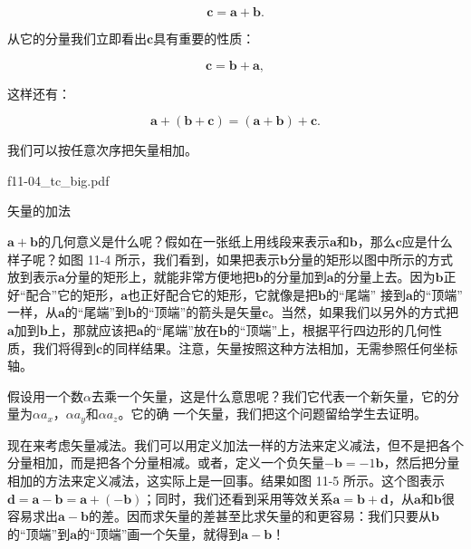 \documentclass[12pt,oneside]{book}
\providecommand{\FLPvec}[1]{\boldsymbol{#1}}
\providecommand{\FLPa}[0]{\FLPvec{a}}
\providecommand{\FLPb}[0]{\FLPvec{b}}
\providecommand{\FLPc}[0]{\FLPvec{c}}
\begin{document}
\begin{equation*}
\FLPc = \FLPa + \FLPb.
\end{equation*}

从它的分量我们立即看出$\boldsymbol{c}$具有重要的性质：

\begin{equation*}
\FLPc = \FLPb + \FLPa,
\end{equation*}

这样还有：

\begin{equation*}
\FLPa + (\FLPb + \FLPc) = (\FLPa + \FLPb) + \FLPc.
\end{equation*}


我们可以按任意次序把矢量相加。

\begin{fig}{f11-04_tc_big.pdf}
\caption{矢量的加法}
\label{fig:图11-4}
\end{fig}

$\boldsymbol{a} + \boldsymbol{b}$的几何意义是什么呢？假如在一张纸上用线段来表示$\boldsymbol{a}$和$\boldsymbol{b}$，那么$\boldsymbol{c}$应是什么样子呢？如图 11-4 所示，我们看到，如果把表示$\boldsymbol{b}$分量的矩形以图中所示的方式放到表示$\boldsymbol{a}$分量的矩形上，就能非常方便地把$\boldsymbol{b}$的分量加到$\boldsymbol{a}$的分量上去。因为$\boldsymbol{b}$正好“配合”它的矩形，$\boldsymbol{a}$也正好配合它的矩形，它就像是把$\boldsymbol{b}$的“尾端” 接到$\boldsymbol{a}$的“顶端” 一样，从$\boldsymbol{a}$的“尾端”到$\boldsymbol{b}$的“顶端”的箭头是矢量$\boldsymbol{c}$。当然，如果我们以另外的方式把$\boldsymbol{a}$加到$\boldsymbol{b}$上，那就应该把$\boldsymbol{a}$的“尾端”放在$\boldsymbol{b}$的“顶端”上，根据平行四边形的几何性质，我们将得到$\boldsymbol{c}$的同样结果。注意，矢量按照这种方法相加，无需参照任何坐标轴。


假设用一个数$\alpha$去乘一个矢量，这是什么意思呢？我们它代表一个新矢量，它的分量为$\alpha a_x$，$\alpha a_y$和$\alpha a_z$。它的确 一个矢量，我们把这个问题留给学生去证明。


现在来考虑矢量减法。我们可以用定义加法一样的方法来定义减法，但不是把各个分量相加，而是把各个分量相减。或者，定义一个负矢量$-\boldsymbol{b} = -1\boldsymbol{b}$，然后把分量相加的方法来定义减法，这实际上是一回事。结果如图 11-5 所示。这个图表示$\boldsymbol{d} = \boldsymbol{a} - \boldsymbol{b} = \boldsymbol{a} + (-\boldsymbol{b})$；同时，我们还看到采用等效关系$\boldsymbol{a} = \boldsymbol{b} + \boldsymbol{d}$，从$\boldsymbol{a}$和$\boldsymbol{b}$很容易求出$\boldsymbol{a} - \boldsymbol{b}$的差。因而求矢量的差甚至比求矢量的和更容易：我们只要从$\boldsymbol{b}$的“顶端”到$\boldsymbol{a}$的“顶端”画一个矢量，就得到$\boldsymbol{a} - \boldsymbol{b}$！
\end{document}
